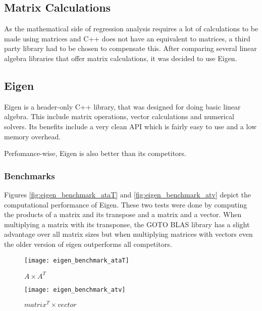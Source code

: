 \subsection{Matrix Calculations}

As the mathematical side of regression analysis requires a lot of calculations to be made using matrices and C++ does not have an equivalent to matrices, a third party library had to be chosen to compensate this. After comparing several linear algebra libraries that offer matrix calculations, it was decided to use Eigen.

\subsection{Eigen}

Eigen is a header-only C++ library, that was designed for doing basic linear algebra. This include matrix operations, vector calculations and numerical solvers. Its benefits include a very clean API which is fairly easy to use and a low memory overhead.

Perfomance-wise, Eigen is also better than its competitors.

\subsubsection{Benchmarks}

Figures \vref{fig:eigen_benchmark_ataT} and \vref{fig:eigen_benchmark_atv} depict the computational performance of Eigen. These two tests were done by computing the products of a matrix and its transpose and a matrix and a vector. When multiplying a matrix with its transponse, the GOTO BLAS library has a slight advantage over all matrix sizes but when multiplying matrices with vectors even the older version of eigen outperforms all competitors.

\begin{figure}[h]
    \centering
    \texttt{[image: eigen\_benchmark\_ataT]}
    \caption{$ A \times A^T $ \autocite{EigenBenchmark}}
    \label{fig:eigen_benchmark_ataT}
\end{figure}

\begin{figure}[h]
    \centering
    \texttt{[image: eigen\_benchmark\_atv]}
    \caption{$ matrix^T \times vector $ \autocite{EigenBenchmark}}
    \label{fig:eigen_benchmark_atv}
\end{figure}

